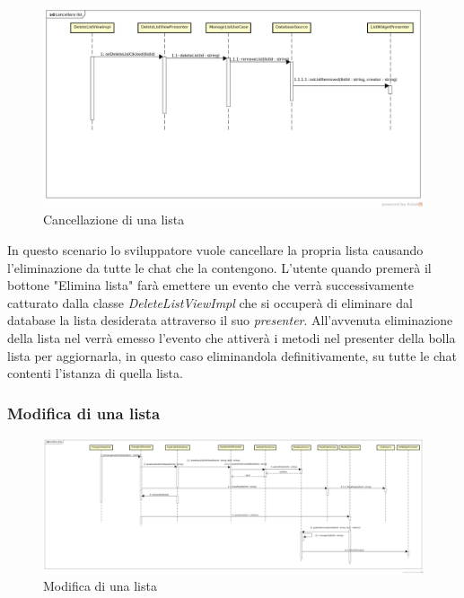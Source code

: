 \label{Cancellazione di una lista}
\begin{figure}[H]
	\centering
	\includegraphics[width=\textwidth]{Sezioni/Diagrammi/App/cancellare_lista.jpg}
	\caption{Cancellazione di una lista}
\end{figure}

In questo scenario lo sviluppatore vuole cancellare la propria lista causando l'eliminazione da tutte le chat che la contengono. L'utente quando premerà il bottone "Elimina lista" farà emettere un evento che verrà successivamente catturato dalla classe \textit{DeleteListViewImpl} che si occuperà di eliminare dal database la lista desiderata attraverso il suo \textit{presenter}. All'avvenuta eliminazione della lista nel  verrà emesso l'evento che attiverà i metodi nel presenter della bolla lista per aggiornarla, in questo caso eliminandola definitivamente, su tutte le chat contenti l'istanza di quella lista. 

\subsubsection{Modifica di una lista}

\label{Modifca di un lista}
\begin{figure}[H]
	\centering
	\includegraphics[width=\textwidth]{Sezioni/Diagrammi/App/modifica_lista.jpg}
	\caption{Modifica di una lista}
\end{figure}

